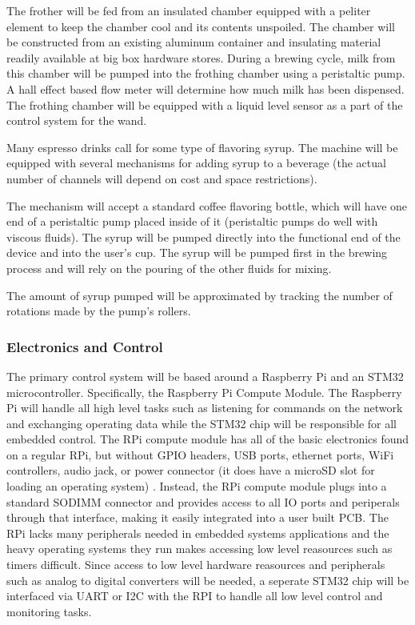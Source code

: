 \documentclass[conference]{IEEEtran}
\begin{document}
The frother will be fed from an insulated chamber equipped with a peliter element
to keep the chamber cool and its contents unspoiled. The chamber will be constructed from
an existing aluminum container and insulating material readily available at big
box hardware stores.
During a brewing cycle, milk from this chamber will be pumped into the frothing
chamber using a peristaltic pump. A hall effect based flow meter will determine how much milk has been dispensed. The frothing chamber
will be equipped with a liquid level sensor as a part of the control system for
the wand.



Many espresso drinks call for some type of flavoring syrup. The machine will be equipped
with several mechanisms for adding syrup to a beverage (the actual number of
channels will depend on cost and space restrictions).

The mechanism will accept a standard coffee flavoring bottle, which will have one end
of a peristaltic pump placed inside of it (peristaltic pumps do well with viscous
fluids). The syrup will be pumped directly into the functional end of the device and
into the user's cup. The syrup will be pumped first in the brewing process and will rely
on the pouring of the other fluids for mixing.

The amount of syrup pumped will be approximated by tracking the number of rotations
made by the pump's rollers.

\subsubsection{Electronics and Control}
The primary control system will be based around a Raspberry Pi and an STM32
microcontroller. Specifically, the
Raspberry Pi Compute Module. The Raspberry Pi will handle all high level tasks
such as listening for commands on the network and exchanging operating data while the
STM32 chip will be responsible for all embedded control. 
The RPi compute module has all of the basic electronics found on a regular RPi, but without GPIO headers, USB ports,
ethernet ports, WiFi controllers, audio jack, or power connector (it does have
a microSD slot for loading an operating system) \cite{RPi}.
Instead, the RPi compute module plugs into a standard SODIMM connector and provides access to all
IO ports and periperals through that interface, making it easily integrated into
a user built PCB. The RPi lacks many peripherals needed in embedded systems
applications and the heavy operating systems they run makes accessing low level
reasources such as timers difficult. Since access to low level hardware
reasources and peripherals such as analog to digital converters will be needed,
a seperate STM32 chip will be interfaced via UART or I2C with the RPI to handle
all low level control and monitoring tasks. 
\end{document}
